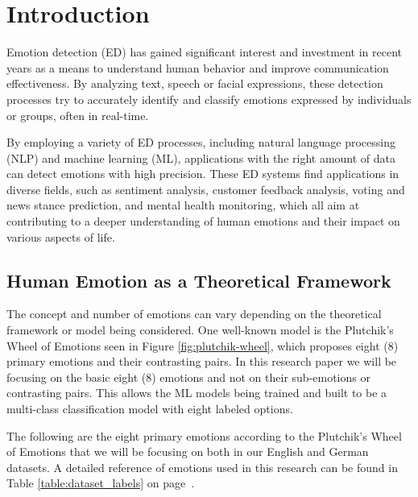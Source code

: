 \documentclass[11pt]{article}
\begin{document}
\clearpage
\section{Introduction}

Emotion detection (ED) has gained significant interest and investment\cite{Sarker2021} in recent years as a means to understand human behavior and improve communication effectiveness. By analyzing text, speech or facial expressions, these detection processes try to accurately identify and classify emotions expressed by individuals or groups, often in real-time.

By employing a variety of ED processes, including natural language processing (NLP) and machine learning (ML), applications with the right amount of data can detect emotions with high precision\cite{research-emotion-recognition-for-online-learning}. These ED systems find applications in diverse fields, such as sentiment analysis, customer feedback analysis, voting and news stance prediction, and mental health monitoring, which all aim at contributing to a deeper understanding of human emotions and their impact on various aspects of life.

\subsection{Human Emotion as a Theoretical Framework}
\label{sec:human-emotion-as-a-theoretical-framework}
The concept and number of emotions can vary depending on the theoretical framework or model being considered. One well-known model is the Plutchik's Wheel of Emotions seen in Figure \ref{fig:plutchik-wheel}, which proposes eight (8) primary emotions and their contrasting pairs. In this research paper we will be focusing on the basic eight (8) emotions and not on their sub-emotions or contrasting pairs. This allows the ML models being trained and built to be a multi-class classification model with eight labeled options.

The following are the eight primary emotions according to the Plutchik's Wheel of Emotions \cite{Tromp} that we will be focusing on both in our English and German datasets. A detailed reference of emotions used in this research can be found in Table \ref{table:dataset_labels} on page~\pageref{table:dataset_labels}.
\end{document}
